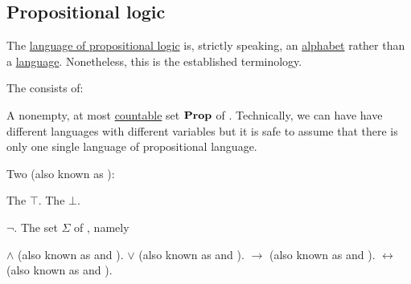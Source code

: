 \subsection{Propositional logic}\label{subsec:propositional_logic}

\begin{remark}\label{rem:propositional_language_is_alphabet}
  The \hyperref[def:propositional_language]{language of propositional logic} is, strictly speaking, an \hyperref[def:language/alphabet]{alphabet} rather than a \hyperref[def:language/language]{language}. Nonetheless, this is the established terminology.
\end{remark}

\begin{definition}\label{def:propositional_language}
  The  consists of:

  \begin{thmenum}
     A nonempty, at most \hyperref[rem:cardinals/countably_infinite]{countable} set \( \operatorname{\mathbf{Prop}} \) of . Technically, we can have have different languages with different variables but it is safe to assume that there is only one single language of propositional language.

     Two  (also known as ):
    \begin{thmenum}
       The  \( \top \).
       The  \( \bot \).
    \end{thmenum}

      \( \neg \).
     The set \( \Sigma \) of , namely
    \begin{thmenum}
        \( \wedge \) (also known as \hyperref[def:standard_boolean_operators]{} and \hyperref[def:semilattice/meet]{}).
        \( \vee \) (also known as \hyperref[def:standard_boolean_operators]{} and \hyperref[def:semilattice/join]{}).
        \( \rightarrow \) (also known as  and \hyperref[def:material_implication]{}).
        \( \leftrightarrow \) (also known as  and ).
    \end{thmenum}


\end{thmenum}
\end{definition}
